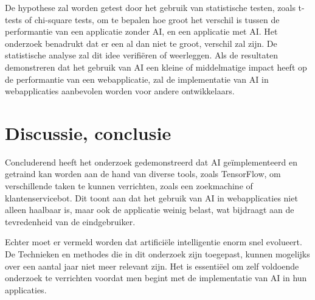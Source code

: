 \documentclass[dutch]{hogent-article}
\begin{document}
De hypothese zal worden getest door het gebruik van statistische testen, zoals t-tests of chi-square tests, om te bepalen hoe groot het verschil is tussen de performantie van een applicatie zonder AI, en een applicatie met AI. Het onderzoek benadrukt dat er een al dan niet te groot, verschil zal zijn. De statistische analyse zal dit idee verifiëren of weerleggen. Als de resultaten demonstreren dat het gebruik van AI een kleine of middelmatige impact heeft op de performantie van een webapplicatie, zal de implementatie van AI in webapplicaties aanbevolen worden voor andere ontwikkelaars.



\section{Discussie, conclusie}%
\label{sec:discussion-conclusion}
Concluderend heeft het onderzoek gedemonstreerd dat AI geïmplementeerd en getraind kan worden aan de hand van diverse tools, zoals TensorFlow, om verschillende taken te kunnen verrichten, zoals een zoekmachine of klantenservicebot. Dit toont aan dat het gebruik van AI in webapplicaties niet alleen haalbaar is, maar ook de applicatie weinig belast, wat bijdraagt aan de tevredenheid van de eindgebruiker.

Echter moet er vermeld worden dat artificiële intelligentie enorm snel evolueert. De Technieken en methodes die in dit onderzoek zijn toegepast, kunnen mogelijks over een aantal jaar niet meer relevant zijn. Het is essentiëel om zelf voldoende onderzoek te verrichten voordat men begint met de implementatie van AI in hun applicaties.




\printbibliography[heading=bibintoc]
\end{document}
